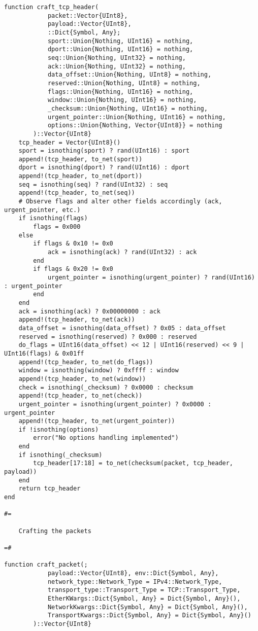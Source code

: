 \begin{lstlisting}[language=JuliaLocal, style=julia]
function craft_tcp_header(
            packet::Vector{UInt8},
            payload::Vector{UInt8},
            ::Dict{Symbol, Any};
            sport::Union{Nothing, UInt16} = nothing,
            dport::Union{Nothing, UInt16} = nothing,
            seq::Union{Nothing, UInt32} = nothing,
            ack::Union{Nothing, UInt32} = nothing,
            data_offset::Union{Nothing, UInt8} = nothing,
            reserved::Union{Nothing, UInt8} = nothing,
            flags::Union{Nothing, UInt16} = nothing,
            window::Union{Nothing, UInt16} = nothing,
            _checksum::Union{Nothing, UInt16} = nothing,
            urgent_pointer::Union{Nothing, UInt16} = nothing,
            options::Union{Nothing, Vector{UInt8}} = nothing
        )::Vector{UInt8}
    tcp_header = Vector{UInt8}()
    sport = isnothing(sport) ? rand(UInt16) : sport
    append!(tcp_header, to_net(sport))
    dport = isnothing(dport) ? rand(UInt16) : dport
    append!(tcp_header, to_net(dport))
    seq = isnothing(seq) ? rand(UInt32) : seq
    append!(tcp_header, to_net(seq))
    # Observe flags and alter other fields accordingly (ack, urgent_pointer, etc.)
    if isnothing(flags)
        flags = 0x000
    else
        if flags & 0x10 != 0x0
            ack = isnothing(ack) ? rand(UInt32) : ack
        end
        if flags & 0x20 != 0x0
            urgent_pointer = isnothing(urgent_pointer) ? rand(UInt16) : urgent_pointer
        end
    end
    ack = isnothing(ack) ? 0x00000000 : ack
    append!(tcp_header, to_net(ack))
    data_offset = isnothing(data_offset) ? 0x05 : data_offset
    reserved = isnothing(reserved) ? 0x000 : reserved
    do_flags = UInt16(data_offset) << 12 | UInt16(reserved) << 9 | UInt16(flags) & 0x01ff
    append!(tcp_header, to_net(do_flags))
    window = isnothing(window) ? 0xffff : window
    append!(tcp_header, to_net(window))
    check = isnothing(_checksum) ? 0x0000 : checksum
    append!(tcp_header, to_net(check))
    urgent_pointer = isnothing(urgent_pointer) ? 0x0000 : urgent_pointer
    append!(tcp_header, to_net(urgent_pointer))
    if !isnothing(options)
        error("No options handling implemented")
    end
    if isnothing(_checksum)
        tcp_header[17:18] = to_net(checksum(packet, tcp_header, payload))
    end
    return tcp_header
end

#=

    Crafting the packets

=#

function craft_packet(;
            payload::Vector{UInt8}, env::Dict{Symbol, Any},
            network_type::Network_Type = IPv4::Network_Type,
            transport_type::Transport_Type = TCP::Transport_Type,
            EtherKWargs::Dict{Symbol, Any} = Dict{Symbol, Any}(),
            NetworkKwargs::Dict{Symbol, Any} = Dict{Symbol, Any}(),
            TransportKwargs::Dict{Symbol, Any} = Dict{Symbol, Any}()
        )::Vector{UInt8}


\end{lstlisting}
